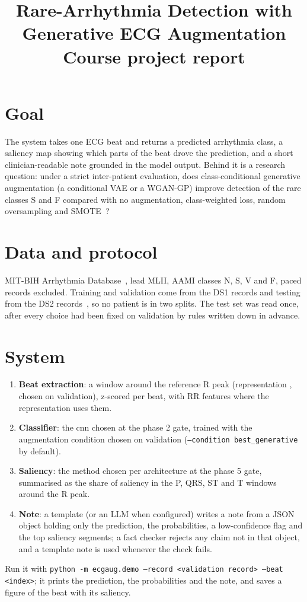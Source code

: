 \documentclass[11pt]{article}
\title{Rare-Arrhythmia Detection with Generative ECG Augmentation\\\large Course project report}
\author{\missing{team members}}
\date{}
\begin{document}
\maketitle

\section{Goal}
The system takes one ECG beat and returns a predicted arrhythmia class, a saliency map showing which parts of the
beat drove the prediction, and a short clinician-readable note grounded in the model output. Behind it is a research
question: under a strict inter-patient evaluation, does class-conditional generative augmentation (a conditional VAE
or a WGAN-GP) improve detection of the rare classes S and F compared with no augmentation, class-weighted loss,
random oversampling and SMOTE~\cite{dechazal2004,chawla2002smote,gulrajani2017wgangp,sohn2015cvae}?

\section{Data and protocol}
MIT-BIH Arrhythmia Database~\cite{moody2001,goldberger2000}, lead MLII, AAMI classes N, S, V and F, paced records
excluded. Training and validation come from the DS1 records and testing from the DS2 records~\cite{dechazal2004}, so no
patient is in two splits. The test set was read once, after every choice had been fixed on validation by rules written
down in advance.
\begin{table}[htbp]\centering\small\caption{Records and beats per split.}\end{table}

\section{System}
\begin{enumerate}
\item \textbf{Beat extraction}: a window around the reference R peak (representation \PhaseOneWinner, chosen on
validation), z-scored per beat, with RR features where the representation uses them.
\item \textbf{Classifier}: the cnn chosen at the phase 2 gate, trained with the augmentation condition chosen on
validation (\texttt{--condition best\_generative} by default).
\item \textbf{Saliency}: the method chosen per architecture at the phase 5 gate, summarised as the share of saliency in
the P, QRS, ST and T windows around the R peak.
\item \textbf{Note}: a template (or an LLM when configured) writes a note from a JSON object holding only the prediction,
the probabilities, a low-confidence flag and the top saliency segments; a fact checker rejects any claim not in that
object, and a template note is used whenever the check fails.
\end{enumerate}
Run it with \texttt{python -m ecgaug.demo --record <validation record> --beat <index>}; it prints the prediction,
the probabilities and the note, and saves a figure of the beat with its saliency.
\end{document}
